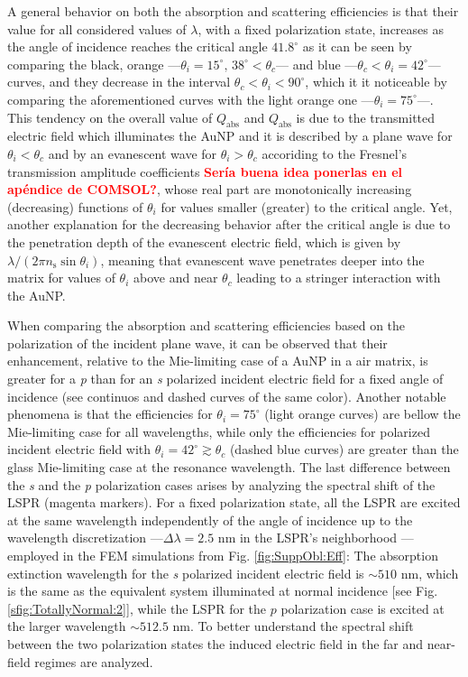 A general behavior on both the absorption and scattering efficiencies is that their value for all considered values of $\lambda$, with a fixed polarization state, increases as the angle of incidence reaches the critical angle $41.8^\circ$ as it can be seen by comparing the black, orange ---$\theta_i = 15^\circ,\, 38^\circ < \theta_c$---  and blue ---$\theta_c<\theta_i = 42^\circ$--- curves, and they decrease in the interval  $\theta_c<\theta_i<90^\circ$, which it it noticeable by comparing the aforementioned curves with the light orange one ---$\theta_i = 75^\circ$---. This tendency on the overall value of $Q_\text{abs}$ and $Q_\text{abs}$ is due to the transmitted electric field which illuminates the AuNP and it is described by a plane wave for $\theta_i<\theta_c$ and by an evanescent wave for $\theta_i>\theta_c$ accoriding to the Fresnel's transmission amplitude coefficients \textcolor{red}{\textbf{Sería buena idea ponerlas en el apéndice de COMSOL?}}, whose real part are monotonically increasing (decreasing) functions of $\theta_i$ for values smaller (greater) to the critical angle. Yet, another explanation for the decreasing behavior after the critical angle is due to the penetration depth of the evanescent electric field, which is given by $\lambda/(2\pi n_\text{s}\sin\theta_i)$, meaning that evanescent wave penetrates deeper into the matrix for values of $\theta_i$ above and near $\theta_c$ leading to a stringer interaction with the AuNP.

When comparing the absorption and scattering efficiencies based on the polarization of the incident plane wave, it can be observed that their enhancement, relative to the Mie-limiting case of a AuNP in a air matrix, is greater for a  \textit{p} than for an \textit{s} polarized incident electric field for a fixed angle of incidence (see continuos and dashed curves of the same color). Another notable phenomena is that the  efficiencies for $\theta_i=75^\circ$ (light orange curves)  are bellow the Mie-limiting case for all wavelengths, while only the efficiencies for   polarized incident electric field with $\theta_i = 42^\circ \gtrsim \theta_c$ (dashed blue curves) are greater than the glass Mie-limiting case at the resonance wavelength. The last difference between the \textit{s} and the \textit{p} polarization cases arises by analyzing the spectral shift of the LSPR (magenta markers). For a fixed polarization state, all the LSPR are excited at the same wavelength independently of the angle of incidence up to the wavelength discretization ---$\Delta \lambda = 2.5$ nm in the LSPR's neighborhood --- employed in the FEM simulations from Fig. \ref{fig:SuppObl:Eff}: The absorption extinction wavelength for the \textit{s} polarized incident electric field is $\sim 510$ nm, which is the same as the equivalent system illuminated at normal incidence [see Fig. \ref{sfig:TotallyNormal:2}], while the LSPR for the $p$ polarization case is excited at the larger wavelength $\sim 512.5$ nm. To better understand the spectral shift between the two polarization states the induced electric field in the far and near-field regimes are analyzed.

